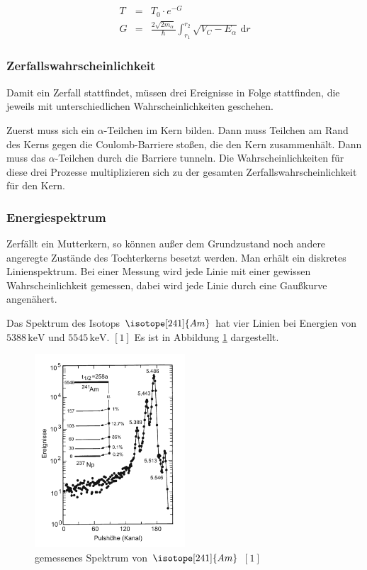 \documentclass[12pt,a4paper]{scrartcl}
\numberwithin{equation}{section} %
\renewcommand{\[}{} %
\renewcommand{\]}{\noindent} %
\begin{document}
\[
\begin{eqnarray}
    T &=& T_0 \cdot e^{-G} \\
    G &=&
        \frac{2\sqrt{2m_\alpha}}{\hbar}
        \int_{r_{1}}^{r_{2}}\sqrt{V_{C}-E_{\alpha}}
        \,\mathrm dr
\end{eqnarray}
\]

\hypertarget{zerfallswahrscheinlichkeit}{%
\subsubsection{Zerfallswahrscheinlichkeit}\label{zerfallswahrscheinlichkeit}}

Damit ein Zerfall stattfindet, müssen drei Ereignisse in Folge
stattfinden, die jeweils mit unterschiedlichen Wahrscheinlichkeiten
geschehen.

Zuerst muss sich ein \(\alpha\)-Teilchen im Kern bilden. Dann muss
Teilchen am Rand des Kerns gegen die Coulomb-Barriere stoßen, die den
Kern zusammenhält. Dann muss das \(\alpha\)-Teilchen durch die Barriere
tunneln. Die Wahrscheinlichkeiten für diese drei Prozesse multiplizieren
sich zu der gesamten Zerfallswahrscheinlichkeit für den Kern.

\hypertarget{energiespektrum}{%
\subsubsection{Energiespektrum}\label{energiespektrum}}

Zerfällt ein Mutterkern, so können außer dem Grundzustand noch andere
angeregte Zustände des Tochterkerns besetzt werden. Man erhält ein
diskretes Linienspektrum. Bei einer Messung wird jede Linie mit einer
gewissen Wahrscheinlichkeit gemessen, dabei wird jede Linie durch eine
Gaußkurve angenähert.

Das Spektrum des Isotops \(\isotope [241]{Am}\) hat vier Linien bei
Energien von \(5388\mathrm{\,keV}\) und \(5545\mathrm{\,keV}\). \([1]\)
Es ist in Abbildung \ref{abb:Spektrum 241Am} dargestellt.

\begin{figure}
	\centering
	\includegraphics[width=0.5\textwidth]{../media/B3.3/Am241_Spektrum.pdf}
	\caption{gemessenes Spektrum von \(\isotope [241]{Am}\) \([1]\)}
	\label{abb:Spektrum 241Am}
\end{figure}
\end{document}
